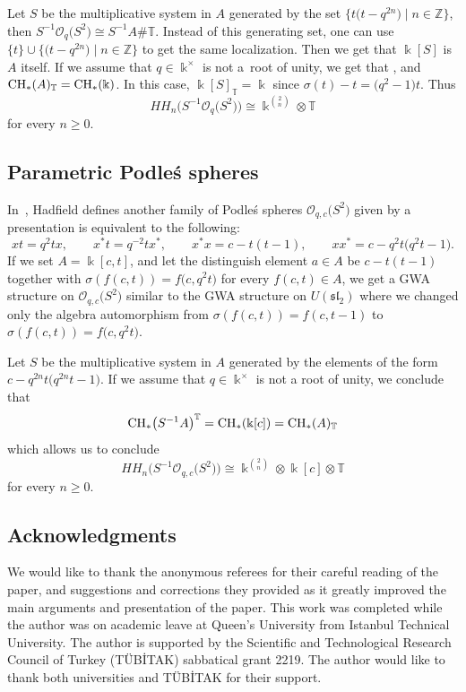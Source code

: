 \documentclass[10pt,a4paper]{amsart}
\newcommand{\G}[1]{\mathfrak{#1}}
\newcommand{\C}[1]{\mathcal{#1}}
\newcommand{\B}[1]{\mathbb{#1}}
\newcommand{\CH}{{\rm CH}}
\renewcommand{\geq}{\geqslant}
\numberwithin{equation}{section}
\begin{document}
Let $S$ be the multiplicative system in $A$ generated by the set $\big\{ t\bigl(t-q^{2n}\bigr)\mid n\in\B{Z} \big\}$,
then ${S^{-1}\C{O}_q\bigl(S^2\bigr) \cong S^{-1}A\# \B{T}}$. Instead of this generating set, one can use
$\{t\}\cup \big\{\bigl(t-q^{2n}\bigr)\mid n\in\B{Z}\big\}$ to get the same localization. Then we get that $\Bbbk[S]$
is $A$ itself. If we assume that $q\in \Bbbk^\times$ is not a~root of unity, we get that
\smash{$
 \CH_*\bigl(S^{-1}A\bigr)^{\B{T}} = \CH^{(0)}_*\bigl(\Bbbk\big[t,t^{-1}\big]\bigr)$}, and $ \CH_*(A)_{\B{T}} = \CH_*(\Bbbk)$.
In this case, $\Bbbk[S]_{\B{T}} = \Bbbk$ since $\sigma(t)-t = \bigl(q^2-1\bigr)t$. Thus
\[ HH_n\bigl(S^{-1}\C{O}_q\bigl(S^2\bigr)\bigr)
 \cong \Bbbk^{\binom{2}{n}}\otimes \B{T}
\]
for every $n\geq 0$.

\subsection{Parametric Podle\'s spheres}

In~\cite{Hadfield:Podles}, Hadfield defines another family of Podle\'s spheres
$\C{O}_{q,c}\bigl(S^2\bigr)$ given by a presentation is equivalent to the following:
\[
 x t = q^2 t x, \qquad
 x^* t = q^{-2} t x^*,\qquad
 x^*x = c - t(t - 1),\qquad
 x x^* = c - q^2 t\bigl(q^2 t -1 \bigr).
\]
If we set $A = \Bbbk[c,t]$, and let the distinguish element $a\in A$ be $c-t(t-1)$
together with $\sigma(f(c,t)) = f\bigl(c,q^2t\bigr)$ for every $f(c,t)\in A$, we get a GWA structure
on $\C{O}_{q,c}\bigl(S^2\bigr)$ similar to the GWA structure on $U(\G{sl}_2)$ where we changed only
the algebra automorphism from $\sigma(f(c,t)) = f(c,t-1)$ to $\sigma(f(c,t)) = f\bigl(c,q^2t\bigr)$.

Let $S$ be the multiplicative system in $A$ generated by the elements of the form
$c-q^{2n}t\bigl(q^{2n}t-1\bigr)$. If we assume that $q\in \Bbbk^\times$ is not a root of unity, we
conclude that
\[
 \CH_*\bigl(S^{-1}A\bigr)^{\B{T}} = \CH_*(\Bbbk[c]) = \CH_*(A)_{\B{T}}
\]
which allows us to conclude
\[
 HH_n\bigl(S^{-1}\C{O}_{q,c}\bigl(S^2\bigr)\bigr)
 \cong \Bbbk^{\binom{2}{n}}\otimes\Bbbk[c]\otimes\B{T}
\]
for every $n\geq 0$.

\subsection*{Acknowledgments}

We would like to thank the anonymous referees for their careful reading of the paper, and
suggestions and corrections they provided as it greatly improved the main arguments and
presentation of the paper. This work was completed while the author was on academic leave
at Queen's University from Istanbul Technical University. The author is supported by the
Scientific and Technological Research Council of Turkey (T\"UB\.{I}TAK) sabbatical grant 2219.
The author would like to thank both universities and T\"UB\.{I}TAK for their support.
\end{document}
